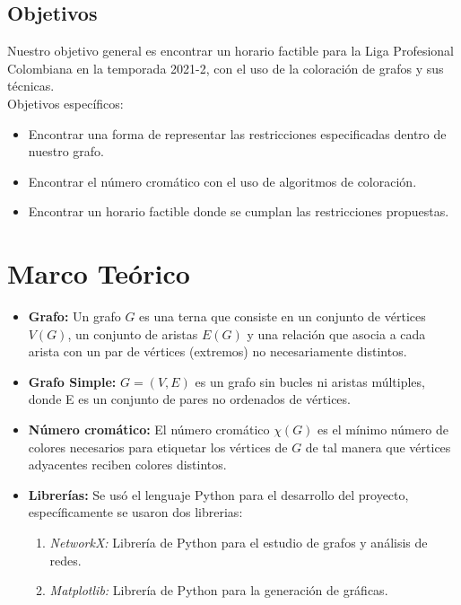 \documentclass[11pt]{article}
\begin{document}
\begin{multicols}{2}
            \subsection{Objetivos}
                Nuestro objetivo general es encontrar un horario factible para la Liga Profesional Colombiana en la temporada 2021-2, con el uso de la coloración 
                de grafos y sus técnicas.\\[10pt]
                Objetivos específicos:
                \begin{itemize}
                    \item Encontrar una forma de representar las restricciones especificadas dentro de nuestro grafo. 
                    \item Encontrar el número cromático con el uso de algoritmos de coloración.
                    \item Encontrar un horario factible donde se cumplan las restricciones propuestas.
                \end{itemize}

        \section{Marco Teórico}

            \begin{itemize}
                \item \textbf{Grafo:} Un grafo $G$ es una terna que consiste en un conjunto de vértices $V(G)$, un conjunto 
                de aristas $E(G)$ y una relación que asocia a cada arista con un par de vértices (extremos) 
                no necesariamente distintos.
                \item \textbf{Grafo Simple:} $G = (V,E)$ es un grafo sin bucles ni aristas múltiples, donde E es un conjunto 
                de pares no ordenados de vértices.
                \item \textbf{Número cromático:} El número cromático $\chi(G)$ es el mínimo número de colores necesarios 
                para etiquetar los vértices de $G$ de tal manera que vértices adyacentes reciben colores 
                distintos.  
                \item \textbf{Librerías:} Se usó el lenguaje Python para el desarrollo del proyecto, específicamente se usaron dos librerias:
                \begin{enumerate}
                    \item \textit{NetworkX:} Librería de Python para el estudio de grafos y análisis de redes.
                    \item \textit{Matplotlib:} Librería de Python para la generación de gráficas.
                \end{enumerate}        
            \end{itemize}
        

\end{multicols}
\end{document}
